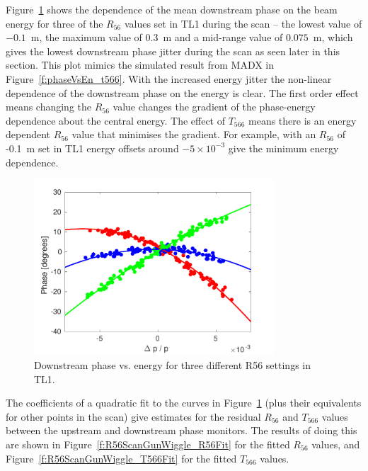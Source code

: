 Figure~\ref{f:R56ScanGunWiggle_PhaseVsEnergy} shows the dependence of the mean downstream phase on the beam energy for three of the \(R_{56}\) values set in TL1 during the scan -- the lowest value of \(-0.1\)~m, the maximum value of \(0.3\)~m and a mid-range value of \(0.075\)~m, which gives the lowest downstream phase jitter during the scan as seen later in this section. This plot mimics the simulated result from MADX in Figure~\ref{f:phaseVsEn_t566}. With the increased energy jitter the non-linear dependence of the downstream phase on the energy is clear. The first order effect means changing the \(R_{56}\) value changes the gradient of the phase-energy dependence about the central energy. The effect of \(T_{566}\) means there is an energy dependent \(R_{56}\) value that minimises the gradient. For example, with an \(R_{56}\) of -0.1~m set in TL1 energy offsets around \(-5\times10^{-3}\) give the minimum energy dependence.

\begin{figure}
  \centering
  \includegraphics[width=0.8\textwidth]{Figures/propagation/R56ScanGunWiggle_PhaseVsEnergy}
  \caption{Downstream phase vs. energy for three different R56 settings in TL1.}
  \label{f:R56ScanGunWiggle_PhaseVsEnergy}
\end{figure}

The coefficients of a quadratic fit to the curves in Figure~\ref{f:R56ScanGunWiggle_PhaseVsEnergy} (plus their equivalents for other points in the scan) give estimates for the residual \(R_{56}\) and \(T_{566}\) values between the upstream and downstream phase monitors. The results of doing this are shown in Figure~\ref{f:R56ScanGunWiggle_R56Fit} for the fitted \(R_{56}\) values, and Figure~\ref{f:R56ScanGunWiggle_T566Fit} for the fitted \(T_{566}\) values. 

